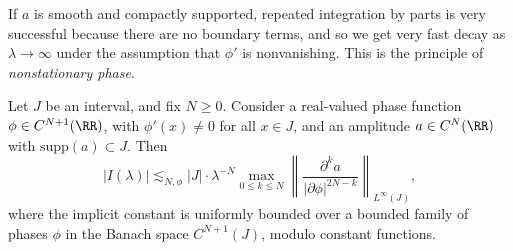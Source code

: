 If $a$ is smooth and compactly supported, repeated integration by parts is very successful because there are no boundary terms, and so we get very fast decay as $\lambda \to \infty$ under the assumption that $\phi'$ is nonvanishing. This is the principle of \emph{nonstationary phase}.

\begin{theorem}
    Let $J$ be an interval, and fix $N \geq 0$. Consider a real-valued phase function $\phi \in C^{N+1}(\RR)$, with $\phi'(x) \neq 0$ for all $x \in J$, and an amplitude $a \in C^N(\RR)$ with $\text{supp}(a) \subset J$. Then
    \[ |I(\lambda)| \lesssim_{N,\phi} |J| \cdot \lambda^{-N} \max_{0 \leq k \leq N} \left\| \frac{\partial^k a}{|\partial \phi|^{2N - k}} \right\|_{L^\infty(J)}, \]
    where the implicit constant is uniformly bounded over a bounded family of phases $\phi$ in the Banach space $C^{N+1}(J)$, modulo constant functions.
\end{theorem}
